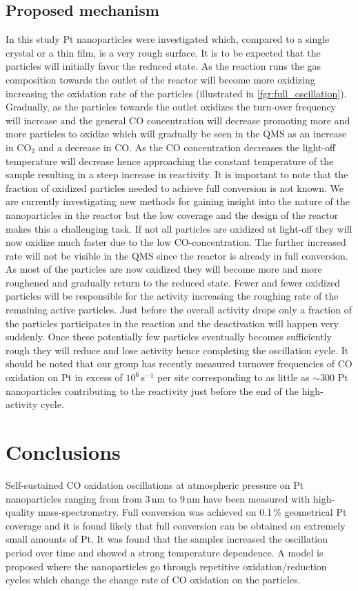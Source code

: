 \documentclass[journal=jacsat,manuscript=article]{achemso}
\begin{document}
\subsection{Proposed mechanism}
In this study Pt nanoparticles were investigated which, compared to a single
crystal or a thin film, is a very rough surface. It is to be expected that the
particles will initially favor the reduced state. As the reaction runs the gas
composition towards the outlet of the reactor will become more oxidizing
increasing the oxidation rate of the particles (illustrated in
\ref{fgr:full_oscillation}). Gradually, as the particles towards the outlet
oxidizes the turn-over frequency will increase and the general CO concentration will
decrease promoting more and more particles to oxidize which will gradually be
seen in the QMS as an increase in CO$_2$ and a decrease in CO. As the CO
concentration decreases the light-off temperature will decrease hence
approaching the constant temperature of the sample resulting in a steep
increase in reactivity. It is important to note that the fraction of oxidized
particles needed to achieve full conversion is not known. We are currently
investigating new methods for gaining insight into the nature of the
nanoparticles in the reactor but the low coverage and the design of the reactor
makes this a challenging task. If not all particles are oxidized at light-off
they will now oxidize much faster due to the low CO-concentration. The further
increased rate will not be visible in the QMS since the reactor is already in
full conversion. As most of the particles are now oxidized they will become
more and more roughened and gradually return to the reduced state. Fewer and
fewer oxidized particles will be responsible for the activity increasing the
roughing rate of the remaining active particles. Just before the overall
activity drops only a fraction of the particles participates in the reaction
and the deactivation will happen very suddenly. Once these potentially few
particles eventually becomes sufficiently rough they will reduce and lose
activity hence completing the oscillation cycle. It should be noted that our
group has recently measured turnover frequencies of CO oxidation on Pt in
excess of $10^{6}$\,s$^{-1}$ per site corresponding to as little as $\sim$300 Pt
nanoparticles contributing to the reactivity just before the end of the high-
activity cycle.

\section{Conclusions}
Self-sustained CO oxidation oscillations at atmospheric pressure on Pt
nanoparticles ranging from from 3\,nm to 9\,nm have been measured with
high-quality mass-spectrometry. Full conversion was achieved on 0.1\,\%
geometrical Pt coverage and it is found likely that full conversion can be obtained on
extremely small amounts of Pt. It was found that the samples increased the
oscillation period over time and showed a strong temperature dependence. A
model is proposed where the nanoparticles go through repetitive
oxidation/reduction cycles which change the change rate of CO oxidation on the
particles.
\end{document}
